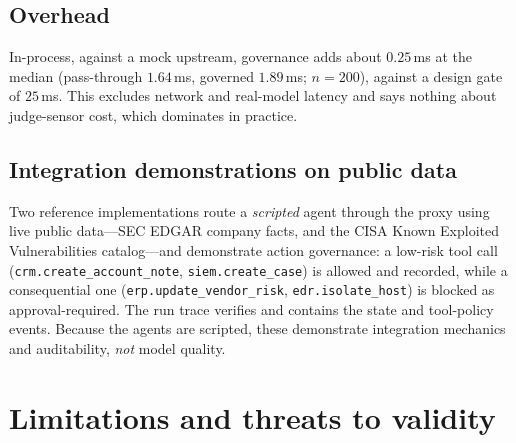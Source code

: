 \documentclass[11pt]{article}
\newcommand{\code}[1]{\texttt{#1}}
\begin{document}
\subsection{Overhead}
In-process, against a mock upstream, governance adds about $0.25$\,ms at the
median (pass-through $1.64$\,ms, governed $1.89$\,ms; $n=200$), against a design
gate of $25$\,ms. This excludes network and real-model latency and says nothing
about judge-sensor cost, which dominates in practice.

\subsection{Integration demonstrations on public data}
Two reference implementations route a \emph{scripted} agent through the proxy
using live public data---SEC EDGAR company facts, and the CISA Known Exploited
Vulnerabilities catalog---and demonstrate action governance: a low-risk tool call
(\code{crm.create\_account\_note}, \code{siem.create\_case}) is allowed and
recorded, while a consequential one (\code{erp.update\_vendor\_risk},
\code{edr.isolate\_host}) is blocked as approval-required. The run trace verifies
and contains the state and tool-policy events. Because the agents are scripted,
these demonstrate integration mechanics and auditability, \emph{not} model
quality.

\section{Limitations and threats to validity}
\label{sec:limits}
\end{document}
